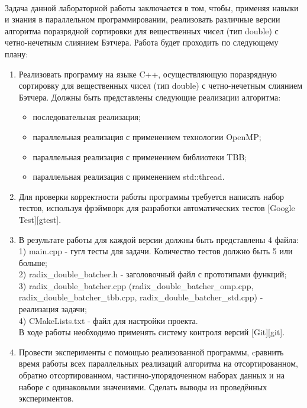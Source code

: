 \documentclass[12pt,a4paper]{article}
\begin{document}
\paragraph{} Задача данной лабораторной работы заключается в том, чтобы, применяя навыки и знания в параллельном программировании, реализовать различные версии алгоритма поразрядной сортировки для вещественных чисел (тип double) с четно-нечетным слиянием Бэтчера. Работа будет проходить по следующему плану:
\begin{enumerate}
\item Реализовать программу на языке C++, осуществляющую  поразрядную сортировку для вещественных чисел (тип double) с четно-нечетным слиянием Бэтчера. Должны быть представлены следующие реализации алгоритма:
\begin{itemize} \item последовательная реализация;  \item параллельная реализация с применением технологии OpenMP;  \item параллельная реализация с применением библиотеки TBB; \item параллельная реализация с применением std::thread. \end{itemize}
\item Для проверки корректности работы программы требуется написать набор тестов, используя фрэймворк для разработки автоматических тестов [Google Test][gtest].
\item  В результате работы для каждой версии должны быть представлены 4 файла:\\
1) main.cpp - гугл тесты для задачи. Количество тестов должно быть 5 или больше;\\
2) radix\_double\_batcher.h - заголовочный файл с прототипами функций; \\
3) radix\_double\_batcher.cpp (radix\_double\_batcher\_omp.cpp,
\\radix\_double\_batcher\_tbb.cpp, radix\_double\_batcher\_std.cpp) - реализация задачи;\\
4) CMakeLists.txt - файл для настройки проекта.\\
В ходе  работы необходимо применять систему контроля версий [Git][git].
\item Провести эксперименты с помощью реализованной программы, cравнить время работы всех параллельных реализаций алгоритма на отсортированном, обратно отсортированном, частично-упорядоченном наборах данных и на наборе с одинаковыми значениями. Сделать выводы из проведённых экспериментов.
\end{enumerate}
\end{document}
